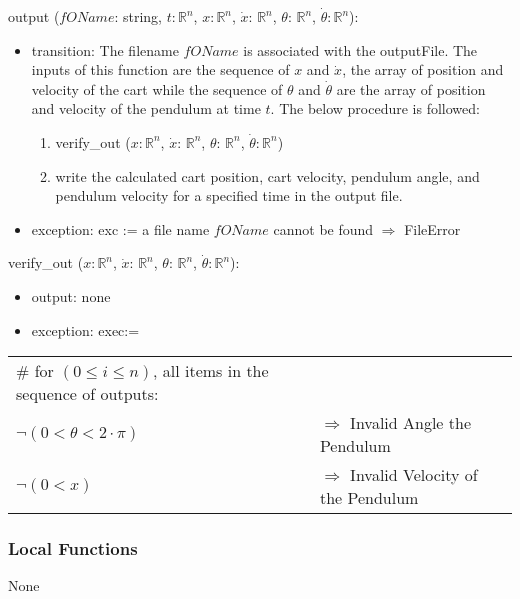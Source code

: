 \documentclass[12pt, titlepage]{article}
\begin{document}
\noindent output ($fOName$: string, $t$$: \mathbb{R}^{n}$, $x$$: \mathbb{R}^{n}$, $\dot{x}$: $\mathbb{R}^{n}$, $\theta$: $\mathbb{R}^{n}$, $\dot{\theta}$$: 
 \mathbb{R}^{n}$):
\begin{itemize}

\item transition: The filename $fOName$ is associated with the outputFile. The inputs of this function are the sequence of $x$ and $\dot{x}$, the array of position and velocity of the cart while the sequence of  $\theta$ and $\dot{\theta}$ are the array of position and velocity of the pendulum at time $t$.
The below procedure is followed:
\begin{enumerate}
\item verify\_out ($x$$: \mathbb{R}^{n}$, $\dot{x}$: $\mathbb{R}^{n}$, $\theta$: $\mathbb{R}^{n}$, $\dot{\theta}$$: \mathbb{R}^{n}$)
\item write the calculated cart position, cart velocity, pendulum angle, and pendulum velocity for a specified time in the output file.
\end{enumerate}

\item exception: exc := a file name $fOName$ cannot be found $\Rightarrow$  FileError

\end{itemize}

\noindent verify\_out ($x$$: \mathbb{R}^{n}$, $\dot{x}$: $\mathbb{R}^{n}$, $\theta$: $\mathbb{R}^{n}$, $\dot{\theta}$$: \mathbb{R}^{n}$):
\begin{itemize}
\item output: none
\item exception: exec:= 
\end{itemize}

\noindent
\begin{longtable*}[l]{l l} 
\# for $ (0 \leq i \leq n)$, all items in the sequence of outputs: \\ 
$\neg  (0 < \theta < 2\cdot\pi)$& $\Rightarrow$ Invalid Angle the Pendulum\\
$\neg  (0 < x)$ & $\Rightarrow$ Invalid Velocity of the Pendulum\\
\end{longtable*}


\subsubsection{Local Functions}
None
\end{document}
